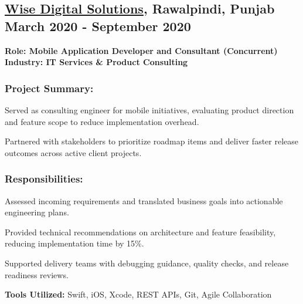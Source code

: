 \subsection{\textbf{\href{https://wisedigitalsolutions.com/}{Wise Digital Solutions}, Rawalpindi, Punjab} \hfill March 2020 - September 2020}
\noindent\textbf{Role: Mobile Application Developer and Consultant (Concurrent)}\\
\noindent\textbf{Industry: IT Services \& Product Consulting}

\subsubsection*{\textbf{Project Summary:}}
\begin{zitemize}
\item Served as consulting engineer for mobile initiatives, evaluating product direction and feature scope to reduce implementation overhead.
\item Partnered with stakeholders to prioritize roadmap items and deliver faster release outcomes across active client projects.
\end{zitemize}

\subsubsection*{\textbf{Responsibilities:}}
\begin{zitemize}
\item Assessed incoming requirements and translated business goals into actionable engineering plans.
\item Provided technical recommendations on architecture and feature feasibility, reducing implementation time by 15\%.
\item Supported delivery teams with debugging guidance, quality checks, and release readiness reviews.
\end{zitemize}

\noindent\textbf{Tools Utilized:} Swift, iOS, Xcode, REST APIs, Git, Agile Collaboration